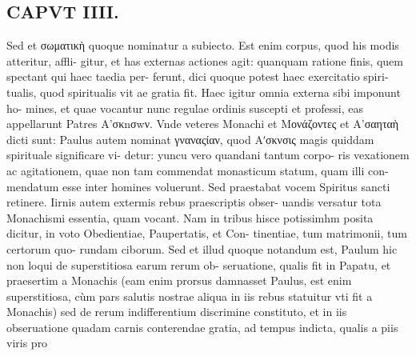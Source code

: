 \documentclass{article}
\begin{document}
\begin{pages}
\section*{CAPVT  IIII. }
\marginpar{[ p.209 ]}\pstart Sed et σωματικὴ quoque nominatur a subiecto. Est enim corpus, quod his modis atteritur, affli- gitur, et has externas actiones agit: quanquam ratione finis, quem spectant qui haec taedia per- ferunt, dici quoque potest haec exercitatio spiri- tualis, quod spiritualis vit ae gratia fit.  \pend\pstart Haec igitur omnia externa sibi imponunt ho- mines, et quae vocantur nunc regulae ordinis suscepti et professi, eas appellarunt Patres A’σκnσwν. Vnde veteres Monachi et Μονάζοντες et Α’σαηταὴ dicti sunt: Paulus autem nominat γναναςίαν, quod Αʹσκνσις magis quiddam spirituale significare vi- detur: yuncu vero quandani tantum corpo- ris vexationem ac agitationem, quae non tam commendat monasticum statum, quam illi con- mendatum esse inter homines voluerunt. Sed praestabat vocem Spiritus sancti retinere.  \pend\pstart Iirnis autem extermis rebus praescriptis obser- uandis versatur tota Monachismi essentia, quam vocant. Nam in tribus hisce potissimhm posita dicitur, in voto Obedientiae, Paupertatis, et Con- tinentiae, tum matrimonii, tum certorum quo- rundam ciborum.  \pend\pstart Sed et illud quoque notandum est, Paulum hic non loqui de superstitiosa earum rerum ob- seruatione, qualis fit in Papatu, et praesertim a Monachis (eam enim prorsus damnasset Paulus, est enim superstitiosa, cùm pars salutis nostrae aliqua in iis rebus statuitur vti fit a Monachis) sed de rerum indifferentium discrimine constituto, et in iis obseruatione quadam carnis conterendae gratia, ad tempus indicta, qualis a piis viris pro  \pend

\end{pages}
\end{document}

